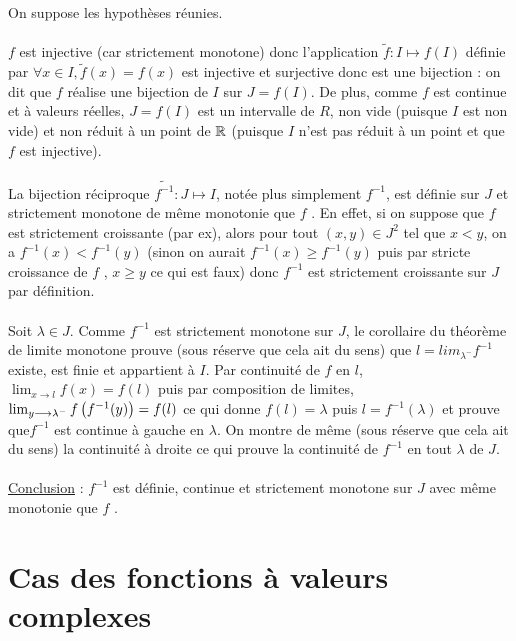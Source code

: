 \begin{dem}
On suppose les hypothèses réunies.\\~\\
\(f\) est injective (car strictement monotone) donc l’application \(\tilde{f} : I \mapsto f (I)\) définie par \(\forall x \in I, \tilde{f} (x) = f (x)\) est injective et surjective donc est une bijection : on dit que \(f\) réalise une bijection de \(I\) sur \(J = f (I)\). De plus, comme \(f\) est continue et à valeurs réelles, \(J = f (I)\) est un intervalle de \(R\), non vide (puisque \(I\) est non vide) et non réduit à un point de \(\mathbb{R}\) (puisque \(I\) n’est pas réduit à un point et que \(f\) est injective).\\~\\
La bijection réciproque \(\tilde{f^{-1}} : J \mapsto I\), notée plus simplement \(f ^{-1}\), est définie sur \(J\) et strictement monotone de même monotonie que \(f\) . En effet, si on suppose que \(f\) est strictement croissante (par ex), alors pour tout \((x, y) \in J^2\) tel que \(x < y\), on a \(f ^{-1}(x) < f ^{-1}(y)\) (sinon on aurait \(f ^{-1}(x) \geq f ^{-1}(y)\) puis par stricte croissance de \(f\) , \(x \geq y\) ce qui est faux) donc \(f ^{-1}\) est strictement croissante sur \(J\) par définition.\\~\\
Soit \(\lambda \in J\). Comme \(f ^{-1}\) est strictement monotone sur \(J\), le corollaire du théorème de limite monotone prouve (sous réserve que cela ait du sens) que \(l = lim _{\lambda^-} f ^{-1}\) existe, est finie et appartient à \(I\). Par continuité de \(f\) en \(l\), \(\lim_{x\to l}f (x) = f (l)\) puis par composition de limites, \(\lim_{ y\longrightarrow\lambda^-} f \left(f ^{-1}(y)\right) = f (l)\) ce qui donne \(f (l) = \lambda\) puis \(l = f ^{-1}(\lambda)\) et prouve que\( f ^{-1}\) est continue à gauche en \(\lambda\). On montre de même (sous réserve que cela ait du sens) la continuité à droite ce qui prouve la continuité de \(f ^{-1}\) en tout \(\lambda\) de \(J\).\\~\\
\underline{Conclusion} : \(f ^{-1}\) est définie, continue et strictement monotone sur \(J\) avec même monotonie que \(f\) .
\end{dem}


\section{Cas des fonctions à valeurs complexes}
